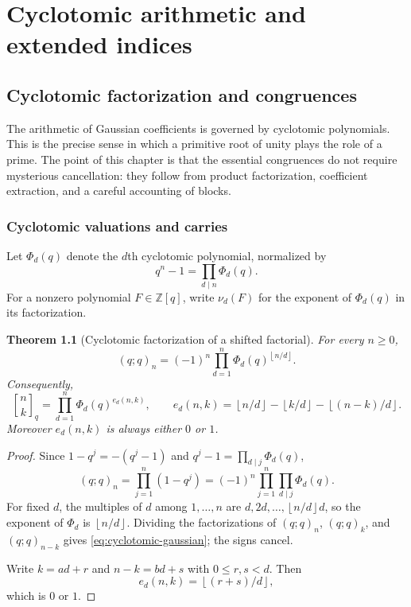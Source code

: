 \documentclass[11pt,oneside,openany]{book}
\newtheorem{theorem}{Theorem}[chapter]
\theoremstyle{definition}
\theoremstyle{remark}
\newcommand{\qbinom}[2]{\genfrac{[}{]}{0pt}{}{#1}{#2}_{q}}
\newcommand{\Z}{\mathbb Z}
\newcommand{\floor}[1]{\left\lfloor #1\right\rfloor}
\begin{document}
\part{Cyclotomic arithmetic and extended indices}

\chapter{Cyclotomic factorization and congruences}\label{chap:cyclotomic}

The arithmetic of Gaussian coefficients is governed by cyclotomic polynomials.  This is the precise sense in which a primitive root of unity plays the role of a prime.  The point of this chapter is that the essential congruences do not require mysterious cancellation: they follow from product factorization, coefficient extraction, and a careful accounting of blocks.

\section{Cyclotomic valuations and carries}

Let $\Phi_d(q)$ denote the $d$th cyclotomic polynomial, normalized by
\[
 q^n-1=\prod_{d\mid n}\Phi_d(q).
\]
For a nonzero polynomial $F\in\Z[q]$, write $\nu_d(F)$ for the exponent of $\Phi_d(q)$ in its factorization.

\begin{theorem}[Cyclotomic factorization of a shifted factorial]\label{thm:cyclotomic-pochhammer}
For every $n\ge0$,
\[
 (q;q)_n=(-1)^n\prod_{d=1}^{n}\Phi_d(q)^{\floor{n/d}}.
\]
Consequently,
\[
 \qbinom nk
 =\prod_{d=1}^{n}\Phi_d(q)^{e_d(n,k)},
 \qquad
 e_d(n,k)=\floor{n/d}-\floor{k/d}-\floor{(n-k)/d}.
 \tag{16.1}\label{eq:cyclotomic-gaussian}
\]
Moreover $e_d(n,k)$ is always either $0$ or $1$.
\end{theorem}

\begin{proof}
Since $1-q^j=-(q^j-1)$ and $q^j-1=\prod_{d\mid j}\Phi_d(q)$,
\[
 (q;q)_n
 =\prod_{j=1}^{n}(1-q^j)
 =(-1)^n\prod_{j=1}^{n}\prod_{d\mid j}\Phi_d(q).
\]
For fixed $d$, the multiples of $d$ among $1,\ldots,n$ are $d,2d,\ldots,\floor{n/d}d$, so the exponent of $\Phi_d$ is $\floor{n/d}$.  Dividing the factorizations of $(q;q)_n$, $(q;q)_k$, and $(q;q)_{n-k}$ gives \eqref{eq:cyclotomic-gaussian}; the signs cancel.

Write $k=ad+r$ and $n-k=bd+s$ with $0\le r,s<d$.  Then
\[
 e_d(n,k)=\floor{(r+s)/d},
\]
which is $0$ or $1$.
\end{proof}
\end{document}
